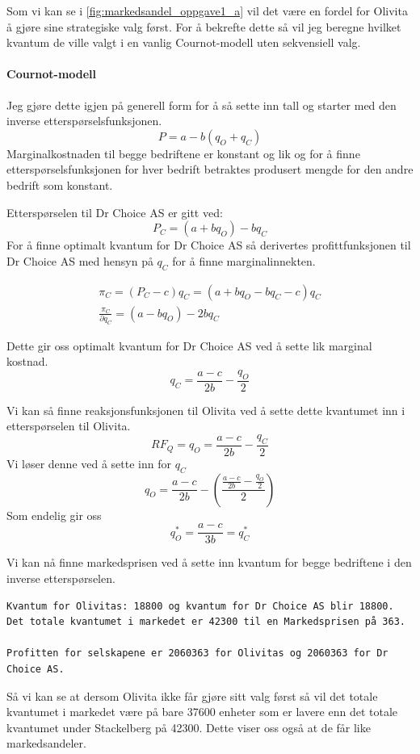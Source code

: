 \documentclass[
  12pt,
  a4paper,
  DIV=11,
  numbers=noendperiod]{scrartcl}
\let\oldparagraph\paragraph
\renewcommand{\paragraph}[1]{\oldparagraph{#1}\mbox{}}
\begin{document}
Som vi kan se i \autoref{fig:markedsandel_oppgave1_a} vil det være en
fordel for Olivita å gjøre sine strategiske valg først. For å bekrefte
dette så vil jeg beregne hvilket kvantum de ville valgt i en vanlig
Cournot-modell uten sekvensiell valg.

\paragraph{Cournot-modell}\label{cournot-modell}

Jeg gjøre dette igjen på generell form for å så sette inn tall og
starter med den inverse etterspørselsfunksjonen. \[
P = a - b(q_O + q_C)
\] Marginalkostnaden til begge bedriftene er konstant og lik og for å
finne etterspørselsfunksjonen for hver bedrift betraktes produsert
mengde for den andre bedrift som konstant.

Etterspørselen til Dr Choice AS er gitt ved: \[
P_C = (a  + bq_O)-bq_C
\] For å finne optimalt kvantum for Dr Choice AS så derivertes
profittfunksjonen til Dr Choice AS med hensyn på \(q_C\) for å finne
marginalinnekten.

\begin{align*}
\pi_C = (P_C - c)q_C = (a  + bq_O - bq_C - c)q_C \\
\frac{\pi_C}{\partial q_C} = (a - bq_O) - 2bq_C
\end{align*}

Dette gir oss optimalt kvantum for Dr Choice AS ved å sette lik marginal
kostnad. \[
q_C = \frac{a - c}{2b} - \frac{q_O}{2}
\]

Vi kan så finne reaksjonsfunksjonen til Olivita ved å sette dette
kvantumet inn i etterspørselen til Olivita. \[
RF_Q = q_O = \frac{a - c}{2b} - \frac{q_C}{2}
\] Vi løser denne ved å sette inn for \(q_C\) \[
q_O = \frac{a - c}{2b} - \left(\frac{\frac{a - c}{2b} - \frac{q_O}{2}}{2}\right)
\] Som endelig gir oss \[
q_O^* = \frac{a - c}{3b} = q_C^*
\]

Vi kan nå finne markedsprisen ved å sette inn kvantum for begge
bedriftene i den inverse etterspørselen.

\begin{verbatim}
Kvantum for Olivitas: 18800 og kvantum for Dr Choice AS blir 18800. 
Det totale kvantumet i markedet er 42300 til en Markedsprisen på 363.

Profitten for selskapene er 2060363 for Olivitas og 2060363 for Dr Choice AS.
\end{verbatim}

Så vi kan se at dersom Olivita ikke får gjøre sitt valg først så vil det
totale kvantumet i markedet være på bare 37600 enheter som er lavere enn
det totale kvantumet under Stackelberg på 42300. Dette viser oss også at
de får like markedsandeler.
\end{document}
